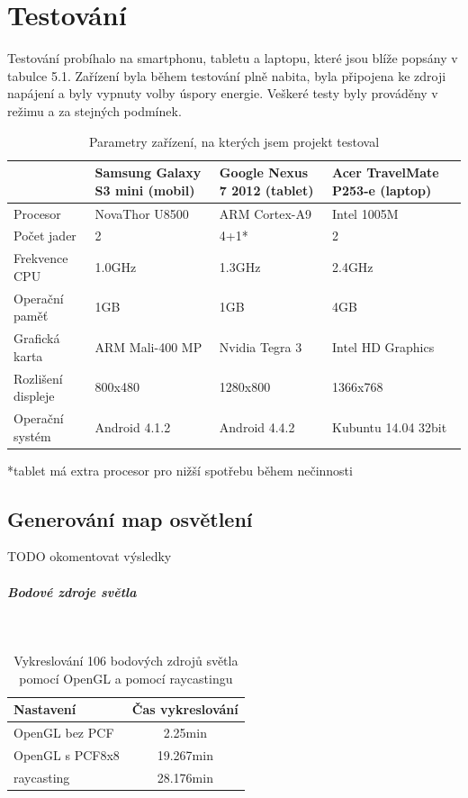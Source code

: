 \documentclass[11pt,twoside,a4paper]{book}
\begin{document}
\chapter{Testování}
Testování probíhalo na smartphonu, tabletu a laptopu, které jsou blíže popsány v tabulce 5.1. Zařízení byla během testování plně nabita, byla připojena ke zdroji napájení a byly vypnuty volby úspory energie. Veškeré testy byly prováděny v režimu  a za stejných podmínek.

\begin{table}[h!]
\begin{center}
\begin{tabular}{|p{35mm}|p{35mm}|p{35mm}|p{35mm}|}
\hline
& \textbf{Samsung Galaxy S3 mini (mobil)} & \textbf{Google Nexus 7 2012 (tablet)} & \textbf{Acer TravelMate P253-e (laptop)} \\
\hline
Procesor & NovaThor U8500 & ARM Cortex-A9 & Intel 1005M \\ \hline
Počet jader & 2 & 4+1* & 2 \\ \hline
Frekvence CPU & 1.0GHz & 1.3GHz & 2.4GHz \\ \hline
Operační paměť & 1GB & 1GB & 4GB \\ \hline
Grafická karta & ARM Mali-400 MP & Nvidia Tegra 3 & Intel HD Graphics \\ \hline
Rozlišení displeje & 800x480 & 1280x800 & 1366x768 \\ \hline
Operační systém & Android 4.1.2 & Android 4.4.2 & Kubuntu 14.04 32bit \\ \hline
\end{tabular}
\caption{Parametry zařízení, na kterých jsem projekt testoval}
*tablet má extra procesor pro nižší spotřebu během nečinnosti
\end{center}
\end{table}
\newpage

\section{Generování map osvětlení}
TODO okomentovat výsledky
\paragraph{Bodové zdroje světla}\ \ \\
\begin{table}[h!]
\begin{center}
\begin{tabular}{|p{50mm}|c|}
\hline
\textbf{Nastavení} & \textbf{Čas vykreslování} \\
\hline
OpenGL bez PCF & 2.25min\\ \hline
OpenGL s PCF8x8 & 19.267min\\ \hline
raycasting & 28.176min\\ \hline
\end{tabular}
\caption{Vykreslování 106 bodových zdrojů světla pomocí OpenGL a pomocí raycastingu}
\end{center}
\end{table}
\end{document}
